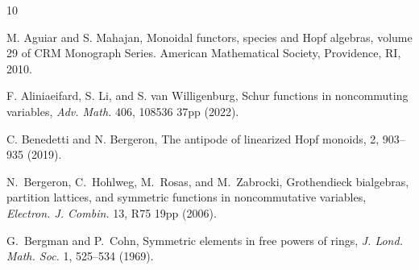 \documentclass[12pt]{amsart}  %
\theoremstyle{definition}
\theoremstyle{remark}
\numberwithin{equation}{section}
\newcommand\svw[1]{{\color{black}{#1}}}
\begin{document}
\def\cprime{$'$}
\begin{thebibliography}{10}


 M. Aguiar and S. Mahajan, Monoidal functors, species and Hopf algebras, volume 29 of CRM Monograph Series. American Mathematical Society, Providence, RI, 2010.

 F. Aliniaeifard, S. Li, and S. van Willigenburg, Schur functions in noncommuting variables,
\emph{Adv. Math.} 406, 108536 37pp (2022).

 C. Benedetti and N. Bergeron, The antipode of linearized Hopf monoids, \svw{\emph{Algebr. Comb.}} 2,  903--935 (2019).


 N.~Bergeron, C.~Hohlweg, M.~Rosas, and M.~Zabrocki, {G}rothendieck bialgebras, partition lattices, and symmetric functions in noncommutative variables, \emph{Electron. J. Combin.} 13, R75 19pp (2006).




 G.~Bergman and P.~Cohn, Symmetric elements in free powers of rings, \emph{J. Lond. Math. Soc.} 1, 525--534 (1969).






\end{thebibliography}
\end{document}
